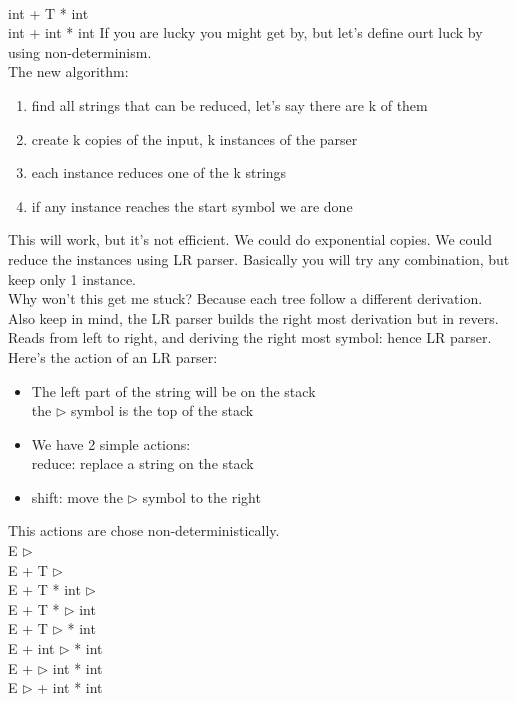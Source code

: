 \documentclass[12pt]{article}
\begin{document}
\\ int + T * int
\\ int + int * int
\vspace{2mm} 
If you are lucky you might get by, but let's define ourt luck by using non-determinism.
\\ The new algorithm: 
\begin{enumerate}
    \item find all strings that can be reduced, let's say there are k of them
    \item create k copies of the input, k instances of the parser
    \item each instance reduces one of the k strings 
    \item if any instance reaches the start symbol we are done
\end{enumerate}
This will work, but it's not efficient. We could do exponential copies. We could reduce the instances using LR parser. Basically you will try any combination, but keep only 1 instance.
\\ Why won't this get me stuck? Because each tree follow a different derivation.
\\ Also keep in mind, the LR parser builds the right most derivation but in revers. Reads from left to right, and deriving the right most symbol: hence LR parser.
\\ Here's the action of an LR parser: 
\begin{itemize}
    \item The left part of the string will be on the stack 
        \\ the $\triangleright$ symbol is the top of the stack 
    \item We have 2 simple actions: 
        \\ reduce: replace a string on the stack 
    \item shift: move the $\triangleright$ symbol to the right
\end{itemize}
\newpage
This actions are chose non-deterministically.
\\ E $\triangleright$
\\ E + T $\triangleright$
\\ E + T * int $\triangleright$
\\ E + T * $\triangleright$ int 
\\ E + T $\triangleright$ * int 
\\ E + int $\triangleright$ * int
\\ E + $\triangleright$ int * int
\\ E $\triangleright$ + int * int 
\end{document}
